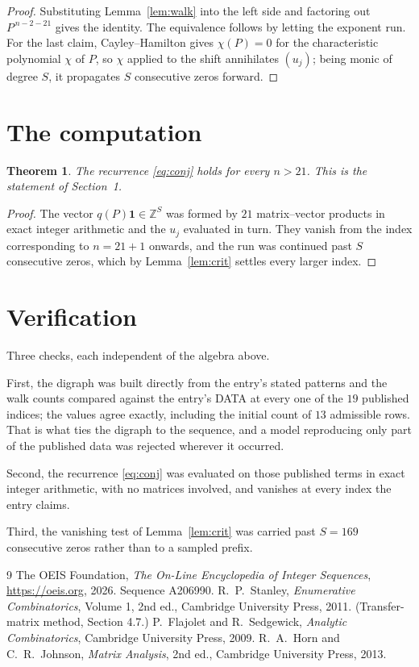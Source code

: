 \documentclass[11pt,a4paper]{article}
\theoremstyle{plain}
\newtheorem{theorem}{Theorem}
\theoremstyle{definition}
\begin{document}
\begin{proof}
Substituting Lemma~\ref{lem:walk} into the left side and factoring out
$P^{\,n-2-21}$ gives the identity. The equivalence follows by letting the exponent
run. For the last claim, Cayley--Hamilton gives $\chi(P)=0$ for the characteristic
polynomial $\chi$ of $P$, so $\chi$ applied to the shift annihilates $(u_j)$; being monic of
degree $S$, it propagates $S$ consecutive zeros forward.
\end{proof}

\section{The computation}

\begin{theorem}
The recurrence \eqref{eq:conj} holds for every $n>21$. This is the statement of
Section~1.
\end{theorem}

\begin{proof}
The vector $q(P)\mathbf{1}\in\mathbb{Z}^{S}$ was formed by $21$ matrix--vector
products in exact integer arithmetic and the $u_j$ evaluated in turn. They vanish from the
index corresponding to $n=21+1$ onwards, and the run was continued past $S$ consecutive
zeros, which by Lemma~\ref{lem:crit} settles every larger index.
\end{proof}

\section{Verification}

Three checks, each independent of the algebra above.

First, the digraph was built directly from the entry's stated patterns and the walk counts
compared against the entry's DATA at every one of the $19$ published indices; the
values agree exactly, including the initial count of $13$ admissible rows. That is
what ties the digraph to the sequence, and a model reproducing only part of the published
data was rejected wherever it occurred.

Second, the recurrence \eqref{eq:conj} was evaluated on those published terms in exact
integer arithmetic, with no matrices involved, and vanishes at every index the entry claims.

Third, the vanishing test of Lemma~\ref{lem:crit} was carried past $S=169$ consecutive
zeros rather than to a sampled prefix.

\begin{thebibliography}{9}
 The OEIS Foundation, \emph{The On-Line Encyclopedia of Integer
Sequences}, \url{https://oeis.org}, 2026. Sequence A206990.
 R.~P.~Stanley, \emph{Enumerative Combinatorics}, Volume 1, 2nd ed.,
Cambridge University Press, 2011. (Transfer-matrix method, Section 4.7.)
 P.~Flajolet and R.~Sedgewick, \emph{Analytic Combinatorics}, Cambridge
University Press, 2009.
 R.~A.~Horn and C.~R.~Johnson, \emph{Matrix Analysis}, 2nd ed., Cambridge
University Press, 2013.
\end{thebibliography}
\end{document}
